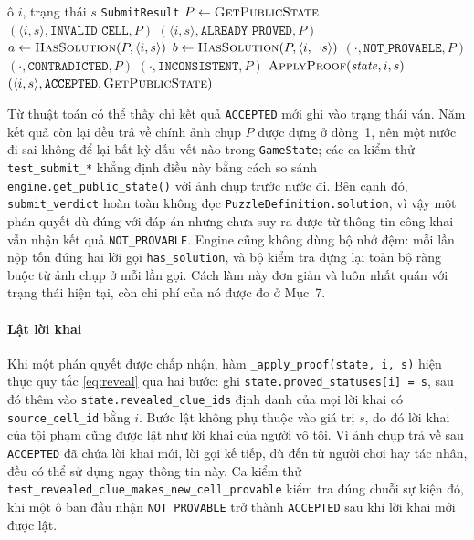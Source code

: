 \begin{sloppypar}
\begin{algorithm}[htbp]
  \caption{\texttt{GameEngine.submit\_verdict}}
  \label{alg:submit_verdict}
  \begin{algorithmic}[1]
    \Require ô $i$, trạng thái $s$
    \Ensure \texttt{SubmitResult}
    \State $P \gets \Call{GetPublicState}{}$ 
     \Return $(\langle i,s\rangle, \texttt{INVALID\_CELL}, P)$ \EndIf
     \Return $(\langle i,s\rangle, \texttt{ALREADY\_PROVED}, P)$ \EndIf
    \State $a \gets \textsc{HasSolution}(P, \langle i, s\rangle)$
    \State $b \gets \textsc{HasSolution}(P, \langle i, \neg s\rangle)$
     \Return $(\cdot, \texttt{NOT\_PROVABLE}, P)$ \EndIf
     \Return $(\cdot, \texttt{CONTRADICTED}, P)$ \EndIf
     \Return $(\cdot, \texttt{INCONSISTENT}, P)$ \EndIf
    \State $\Call{ApplyProof}{\mathit{state}, i, s}$ 
    \State \Return $(\langle i,s\rangle, \texttt{ACCEPTED}, \Call{GetPublicState}{})$
  \end{algorithmic}
\end{algorithm}

Từ thuật toán có thể thấy chỉ kết quả \texttt{ACCEPTED} mới ghi vào trạng thái
ván. Năm kết quả còn lại đều trả về chính ảnh chụp $P$ được dựng ở dòng~1, nên
một nước đi sai không để lại bất kỳ dấu vết nào trong \texttt{GameState}; các ca
kiểm thử \texttt{test\_submit\_*} khẳng định điều này bằng cách so sánh
\texttt{engine.get\_public\_state()} với ảnh chụp trước nước đi. Bên cạnh đó,
\texttt{submit\_verdict} hoàn toàn không đọc \texttt{PuzzleDefinition.solution},
vì vậy một phán quyết dù đúng với đáp án nhưng chưa suy ra được từ thông tin
công khai vẫn nhận kết quả \texttt{NOT\_PROVABLE}. Engine cũng không dùng bộ nhớ
đệm: mỗi lần nộp tốn đúng hai lời gọi \texttt{has\_solution}, và bộ kiểm tra dựng
lại toàn bộ ràng buộc từ ảnh chụp ở mỗi lần gọi. Cách làm này đơn giản và luôn
nhất quán với trạng thái hiện tại, còn chi phí của nó được đo ở Mục~7.

\paragraph{Lật lời khai}
Khi một phán quyết được chấp nhận, hàm \texttt{\_apply\_proof(state, i, s)} hiện
thực quy tắc \eqref{eq:reveal} qua hai bước: ghi \texttt{state.proved\_statuses[i]
= s}, sau đó thêm vào \texttt{state.revealed\_clue\_ids} định danh của mọi lời
khai có \texttt{source\_cell\_id} bằng $i$. Bước lật không phụ thuộc vào giá trị
$s$, do đó lời khai của tội phạm cũng được lật như lời khai của người vô tội. Vì
ảnh chụp trả về sau \texttt{ACCEPTED} đã chứa lời khai mới, lời gọi kế tiếp, dù
đến từ người chơi hay tác nhân, đều có thể sử dụng ngay thông tin này. Ca kiểm
thử \texttt{test\_revealed\_clue\_makes\_new\_cell\_provable} kiểm tra đúng chuỗi
sự kiện đó, khi một ô ban đầu nhận \texttt{NOT\_PROVABLE} trở thành
\texttt{ACCEPTED} sau khi lời khai mới được lật.


\end{sloppypar}
